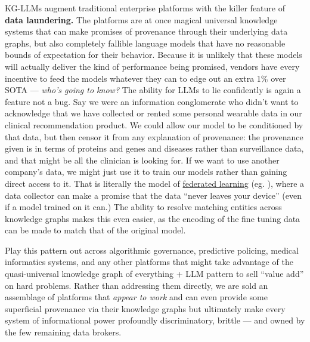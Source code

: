\documentclass{article}
\begin{document}
KG-LLMs augment traditional enterprise platforms with the killer feature
of \textbf{data laundering.} The platforms are at once magical universal
knowledge systems that can make promises of provenance through their
underlying data graphs, but also completely fallible language models
that have no reasonable bounds of expectation for their behavior.
Because it is unlikely that these models will actually deliver the kind
of performance being promised, vendors have every incentive to feed the
models whatever they can to edge out an extra 1\% over SOTA --- \emph{who's going to know?} The
ability for LLMs to lie confidently is again a feature not a bug. Say we
were an information conglomerate who didn't want to acknowledge that we
have collected or rented some personal wearable data in our clinical
recommendation product. We could allow our model to be conditioned by that data, but
then censor it from any explanation of provenance: the provenance given
is in terms of proteins and genes and diseases rather than surveillance
data, and that might be all the clinician is looking for. If we want to
use another company's data, we might just use it to train our models
rather than gaining direct access to it. That is literally the model of
\href{https://en.wikipedia.org/wiki/Federated_learning}{federated
learning} (eg. \cite{sadilekPrivacyfirstHealthResearch2021, mcmahanTrainingUserlevelDifferentially2022} ), where a data collector
can make a promise that the data ``never leaves your device'' (even if a
model trained on it can.) The ability to resolve matching entities
across knowledge graphs makes this even easier, as the encoding of the
fine tuning data can be made to match that of the original model.

Play this pattern out across algorithmic governance, predictive
policing, medical informatics systems, and any other platforms that
might take advantage of the quasi-universal knowledge graph of
everything + LLM pattern to sell ``value add'' on hard problems. Rather
than addressing them directly, we are sold an assemblage of platforms
that \emph{appear to work} and can even provide some superficial
provenance via their knowledge graphs but ultimately make every system
of informational power profoundly discriminatory, brittle --- and owned
by the few remaining data brokers.
\end{document}
